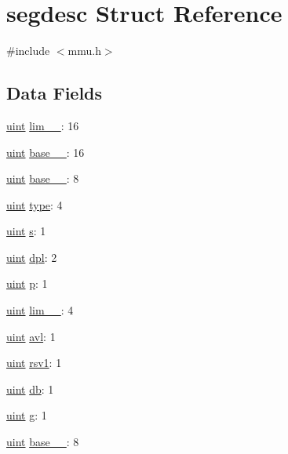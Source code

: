 \hypertarget{structsegdesc}{\section{segdesc Struct Reference}
\label{structsegdesc}
}


{\ttfamily \#include $<$mmu.\-h$>$}

\subsection*{Data Fields}
\begin{DoxyCompactItemize}
\item 
\hyperlink{types_8h_a91ad9478d81a7aaf2593e8d9c3d06a14}{uint} \hyperlink{structsegdesc_aa05f1f5cdd8d56cc9f8c331ceeda7813}{lim\-\_\-\_}\-: 16
\item 
\hyperlink{types_8h_a91ad9478d81a7aaf2593e8d9c3d06a14}{uint} \hyperlink{structsegdesc_a5b20f16107a37790349fb5c3856c6c01}{base\-\_\-\_}\-: 16
\item 
\hyperlink{types_8h_a91ad9478d81a7aaf2593e8d9c3d06a14}{uint} \hyperlink{structsegdesc_a80d2085d2e280c3bbd1420fb452680e2}{base\-\_\-\_}\-: 8
\item 
\hyperlink{types_8h_a91ad9478d81a7aaf2593e8d9c3d06a14}{uint} \hyperlink{structsegdesc_a4e4020c6e82bee6562d5bc3c1657cafe}{type}\-: 4
\item 
\hyperlink{types_8h_a91ad9478d81a7aaf2593e8d9c3d06a14}{uint} \hyperlink{structsegdesc_a35181190d39e3d895c0ab657aceabb54}{s}\-: 1
\item 
\hyperlink{types_8h_a91ad9478d81a7aaf2593e8d9c3d06a14}{uint} \hyperlink{structsegdesc_af007c16108fee6bd537fac7128283b6e}{dpl}\-: 2
\item 
\hyperlink{types_8h_a91ad9478d81a7aaf2593e8d9c3d06a14}{uint} \hyperlink{structsegdesc_afca19e8f7fcc079e05083a7012c34ccf}{p}\-: 1
\item 
\hyperlink{types_8h_a91ad9478d81a7aaf2593e8d9c3d06a14}{uint} \hyperlink{structsegdesc_abe13981739b3fcc0205ee38da6c18cc9}{lim\-\_\-\_}\-: 4
\item 
\hyperlink{types_8h_a91ad9478d81a7aaf2593e8d9c3d06a14}{uint} \hyperlink{structsegdesc_a3fe31ffafb8c060bbfce5cc88bc4a7c3}{avl}\-: 1
\item 
\hyperlink{types_8h_a91ad9478d81a7aaf2593e8d9c3d06a14}{uint} \hyperlink{structsegdesc_a3c18a496ce0a34acbeb84338e3021797}{rsv1}\-: 1
\item 
\hyperlink{types_8h_a91ad9478d81a7aaf2593e8d9c3d06a14}{uint} \hyperlink{structsegdesc_a04ab5582b63d915355818185ba20a9c4}{db}\-: 1
\item 
\hyperlink{types_8h_a91ad9478d81a7aaf2593e8d9c3d06a14}{uint} \hyperlink{structsegdesc_a507f46d64a589eaa3bf729789889283c}{g}\-: 1
\item 
\hyperlink{types_8h_a91ad9478d81a7aaf2593e8d9c3d06a14}{uint} \hyperlink{structsegdesc_aa4e2821f8c7d1fb00ed552f59d07f59a}{base\-\_\-\_}\-: 8
\end{DoxyCompactItemize}


